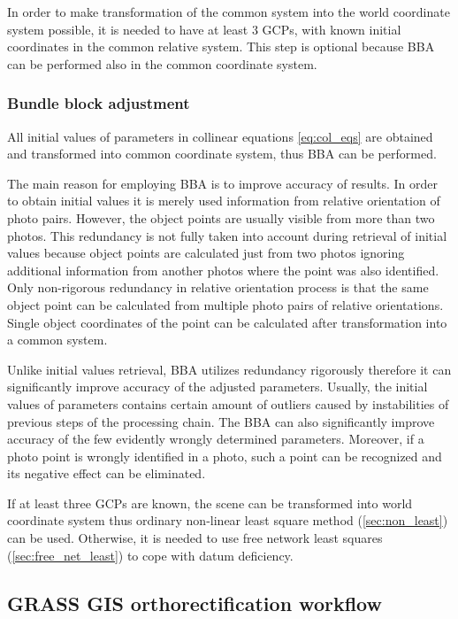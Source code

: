 \documentclass[a4paper,12pt]{article}
\begin{document}
In order to make transformation of the common system into the world coordinate system possible, it is needed 
to have at least 3 GCPs, with known initial coordinates in the common relative system. 
This step is optional because  BBA can be performed also in the common coordinate system. 

\subsubsection{Bundle block adjustment}

All initial values of parameters in collinear equations \eqref{eq:col_eqs} are obtained and transformed into common coordinate system, thus 
BBA can be performed.

The main reason for employing BBA is to improve accuracy of results.
In order to obtain initial values it is merely used information from relative orientation of photo pairs.
However, the object points are usually visible from more than two photos. This redundancy is not fully taken 
into account during retrieval of initial values because object points are calculated just from two photos
ignoring additional information from another photos where the point was also identified.
Only non-rigorous redundancy  in relative orientation process is that the same object point can 
be calculated from multiple photo pairs of relative orientations.
Single object coordinates of the point can be calculated after transformation into a common system.  


Unlike initial values retrieval, BBA utilizes redundancy rigorously therefore 
it can significantly improve accuracy of the adjusted parameters.
Usually, the initial values of parameters contains certain amount of outliers caused by instabilities of previous steps of the processing chain.
The BBA can also significantly improve accuracy of the few evidently wrongly determined parameters.
Moreover, if a photo point is wrongly identified in a photo, such a point can be recognized and its 
negative effect can be eliminated.

If at least three GCPs are known, the scene can be transformed into world coordinate system thus ordinary non-linear least square method (\ref{sec:non_least}) 
can be used. Otherwise,
it is needed to use free network least squares (\ref{sec:free_net_least}) to cope with datum deficiency. 

\subsection{GRASS GIS orthorectification workflow}
\end{document}
